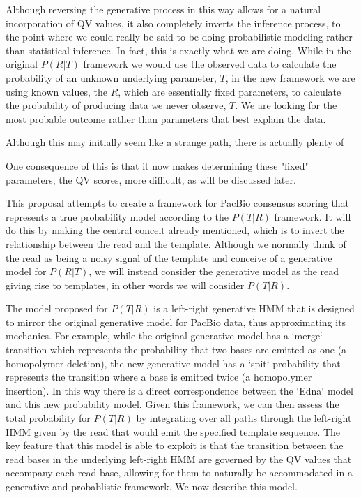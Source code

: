 \documentclass[fleqn,10pt]{SelfArx} %
\begin{document}
Although reversing the generative process in this way allows for a natural incorporation of QV values, it also completely inverts the inference process, to the point where we could really be said to be doing probabilistic modeling rather than statistical inference.  In fact, this is exactly what we are doing.  While in the original $P(R|T)$ framework we would use the observed data to calculate the probability of an unknown underlying parameter, $T$, in the new framework we are using known values, the $R$, which are essentially fixed parameters, to calculate the probability of producing data we never observe, $T$.  We are looking for the most probable outcome rather than parameters that best explain the data.

Although this may initially seem like a strange path, there is actually plenty of 

One consequence of this is that it now makes determining these "fixed" parameters, the QV scores, more difficult, as will be discussed later. 

This proposal attempts to create a framework for PacBio consensus scoring that represents a true probability model according to the $P(T|R)$ framework.  It will do this by making the central conceit already mentioned, which is to invert the relationship between the read and the template.  Although we normally think of the read as being a noisy signal of the template and conceive of a generative model for $P(R|T)$, we will instead consider the generative model as the read giving rise to templates, in other words we will consider $P(T|R)$.  

The model proposed for $P(T|R)$ is a left-right generative HMM that is designed to mirror the original generative model for PacBio data, thus approximating its mechanics.  For example, while the original generative model has a `merge` transition which represents the probability that two bases are emitted as one (a homopolymer deletion), the new generative model has a `spit` probability that represents the transition where a base is emitted twice (a homopolymer insertion).  In this way there is a direct correspondence between the `Edna` model and this new probability model.  Given this framework, we can then assess the total probability for $P(T|R)$ by integrating over all paths through the left-right HMM given by the read that would emit the specified template sequence.  The key feature that this model is able to exploit is that the transition between the read bases in the underlying left-right HMM are governed by the QV values that accompany each read base, allowing for them to naturally be accommodated in a generative and probablistic framework.  We now describe this model.
\end{document}
